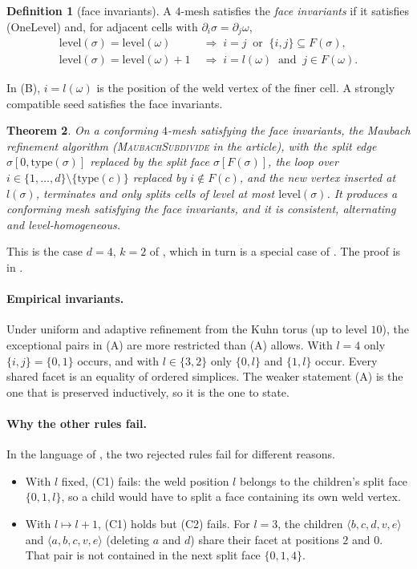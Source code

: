 \documentclass[11pt]{article}
\theoremstyle{plain}
\newtheorem{theorem}{Theorem}[section]
\theoremstyle{definition}
\newtheorem{definition}[theorem]{Definition}
\theoremstyle{remark}
\newcommand{\type}{\mathrm{type}}
\newcommand{\level}{\mathrm{level}}
\begin{document}
\begin{definition}[face invariants]\label{def:face}
A $4$-mesh satisfies the \emph{face invariants} if it satisfies
(OneLevel) and, for adjacent cells with $\partial_i\sigma=\partial_j\omega$,
\begin{align*}
  \level(\sigma)=\level(\omega)&\;\Longrightarrow\; i=j\ \text{ or }\ \{i,j\}\subseteq F(\sigma), \tag{A}\\
  \level(\sigma)=\level(\omega)+1&\;\Longrightarrow\; i=l(\omega)\ \text{ and }\ j\in F(\omega). \tag{B}
\end{align*}
\end{definition}
In (B), $i=l(\omega)$ is the position of the weld vertex of the finer
cell. A strongly compatible seed satisfies the face invariants.

\begin{theorem}\label{thm:face}
On a conforming $4$-mesh satisfying the face invariants, the Maubach
refinement algorithm (\textsc{MaubachSubdivide} in the article), with the split edge
$\sigma[0,\type(\sigma)]$ replaced by the split face $\sigma[F(\sigma)]$,
the loop over $i\in\{1,\dots,d\}\setminus\{\type(c)\}$ replaced by
$i\notin F(c)$, and the new vertex inserted at $l(\sigma)$, terminates and
only splits cells of level at most $\level(\sigma)$. It produces a
conforming mesh satisfying the face invariants, and it is consistent,
alternating and level-homogeneous.
\end{theorem}

This is the case $d=4$, $k=2$ of , which in turn is a
special case of . The proof is in .

\paragraph{Empirical invariants.}
Under uniform and adaptive refinement from the Kuhn torus (up to level
$10$), the exceptional pairs in (A) are more restricted than (A) allows.
With $l=4$ only $\{i,j\}=\{0,1\}$ occurs, and with $l\in\{3,2\}$ only
$\{0,l\}$ and $\{1,l\}$ occur. Every shared facet is an equality of ordered
simplices. The weaker statement (A) is the one that is preserved
inductively, so it is the one to state.

\paragraph{Why the other rules fail.}
In the language of , the two rejected rules fail for
different reasons.
\begin{itemize}
\item With $l$ fixed, (C1) fails: the weld position $l$ belongs to the
  children's split face $\{0,1,l\}$, so a child would have to split a
  face containing its own weld vertex.
\item With $l\mapsto l+1$, (C1) holds but (C2) fails. For $l=3$, the
  children $\langle b,c,d,v,e\rangle$ and $\langle a,b,c,v,e\rangle$
  (deleting $a$ and $d$) share their facet at positions $2$ and $0$. That
  pair is not contained in the next split face $\{0,1,4\}$.
\end{itemize}
\end{document}
